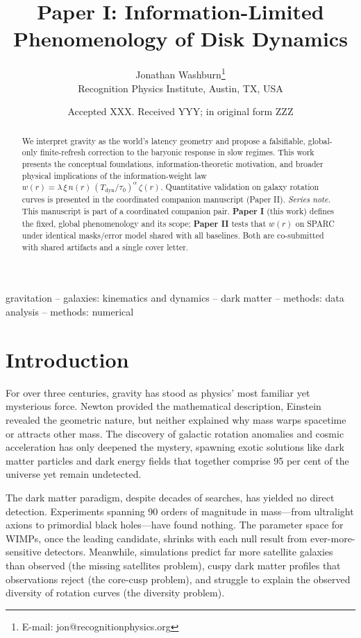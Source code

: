 \documentclass[usenatbib]{mnras}
\title[Information-Limited Phenomenology of Disk Dynamics]{Paper I: Information-Limited Phenomenology of Disk Dynamics}
\author[J. Washburn]{Jonathan Washburn\thanks{E-mail: jon@recognitionphysics.org}\\
Recognition Physics Institute, Austin, TX, USA
}
\date{Accepted XXX. Received YYY; in original form ZZZ}
\begin{document}
\maketitle

\begin{abstract}
We interpret gravity as the world's latency geometry and propose a falsifiable, global-only finite-refresh correction to the baryonic response in slow regimes. This work presents the conceptual foundations, information-theoretic motivation, and broader physical implications of the information-weight law $w(r)=\lambda\,\xi\,n(r)\,(T_{\text{dyn}}/\tau_0)^\alpha\,\zeta(r)$. Quantitative validation on galaxy rotation curves is presented in the coordinated companion manuscript (Paper II).
\vspace{0.5em}
\noindent\textit{Series note.} This manuscript is part of a coordinated companion pair. \textbf{Paper I} (this work) defines the fixed, global phenomenology and its scope; \textbf{Paper II} tests that $w(r)$ on SPARC under identical masks/error model shared with all baselines. Both are co-submitted with shared artifacts and a single cover letter.
\end{abstract}

\begin{keywords}
gravitation -- galaxies: kinematics and dynamics -- dark matter -- methods: data analysis -- methods: numerical
\end{keywords}

\section{Introduction}

For over three centuries, gravity has stood as physics' most familiar yet mysterious force. Newton provided the mathematical description, Einstein revealed the geometric nature, but neither explained why mass warps spacetime or attracts other mass. The discovery of galactic rotation anomalies \citep{rubin1970} and cosmic acceleration \citep{riess1998} has only deepened the mystery, spawning exotic solutions like dark matter particles and dark energy fields that together comprise 95 per cent of the universe yet remain undetected.

The dark matter paradigm, despite decades of searches, has yielded no direct detection. Experiments spanning 90 orders of magnitude in mass---from ultralight axions to primordial black holes---have found nothing. The parameter space for WIMPs, once the leading candidate, shrinks with each null result from ever-more-sensitive detectors. Meanwhile, simulations predict far more satellite galaxies than observed (the missing satellites problem), cuspy dark matter profiles that observations reject (the core-cusp problem), and struggle to explain the observed diversity of rotation curves (the diversity problem).
\end{document}
